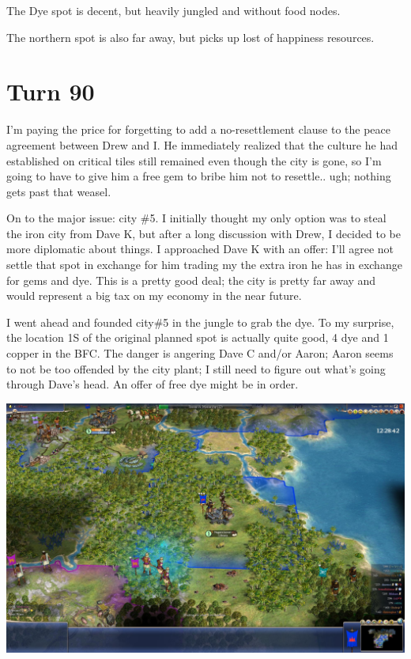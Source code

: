 \documentclass[10pt]{article}
\begin{document}
The Dye spot is decent, but heavily jungled and without food nodes.

The northern spot is also far away, but picks up lost of happiness resources.

\section*{Turn 90}

I'm paying the price for forgetting to add a no-resettlement clause to
the peace agreement between Drew and I. He immediately realized that
the culture he had established on critical tiles still remained even
though the city is gone, so I'm going to have to give him a free gem
to bribe him not to resettle.. ugh; nothing gets past that weasel.

On to the major issue: city \#5. I initially thought my only option was
to steal the iron city from Dave K, but after a long discussion with
Drew, I decided to be more diplomatic about things. I approached Dave
K with an offer: I'll agree not settle that spot in exchange for him
trading my the extra iron he has in exchange for gems and dye. This is
a pretty good deal; the city is pretty far away and would represent a
big tax on my economy in the near future.

I went ahead and founded city\#5 in the jungle to grab the dye. To my
surprise, the location 1S of the original planned spot is actually
quite good, 4 dye and 1 copper in the BFC. The danger is angering Dave
C and/or Aaron; Aaron seems to not be too offended by the city plant;
I still need to figure out what's going through Dave's head. An offer
of free dye might be in order.

\includegraphics[width=1.0\textwidth]{turn90-1}
\end{document}
